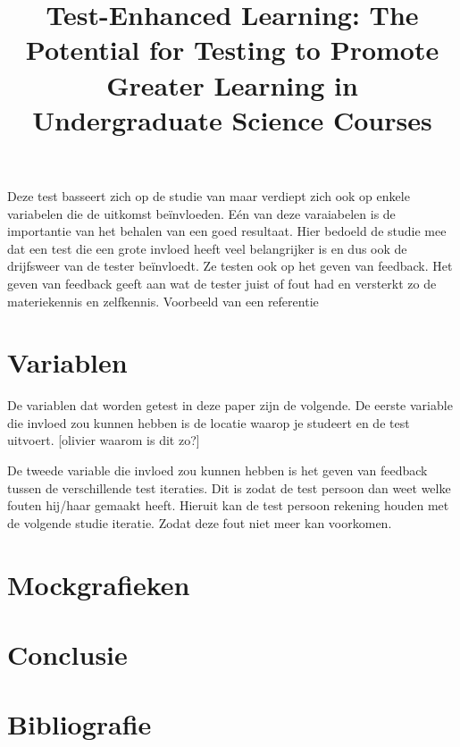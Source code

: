 \documentclass{hogent-article}
\begin{document}
    \title{Test-Enhanced Learning: The Potential for Testing to Promote Greater Learning in Undergraduate Science Courses}
    Deze test basseert zich op de studie van \autocite{} maar verdiept zich ook op enkele variabelen die de uitkomst beïnvloeden. Eén van deze varaiabelen is de importantie van het behalen van een goed resultaat. Hier bedoeld de studie mee dat een test die een grote invloed heeft veel belangrijker is en dus ook de drijfsweer van de tester beïnvloedt.
    Ze testen ook op het geven van feedback. Het geven van feedback geeft aan wat de tester juist of fout had en versterkt zo de materiekennis en zelfkennis.
	Voorbeeld van een referentie~\autocite{karpicke2008critical}
	
	\section{Variablen}
	De variablen dat worden getest in deze paper zijn de volgende.
	De eerste variable die invloed zou kunnen hebben is de locatie waarop je studeert en de test uitvoert.
	[olivier waarom is dit zo?]
	
	De tweede variable die invloed zou kunnen hebben is het geven van feedback tussen de verschillende test iteraties. 
	Dit is zodat de test persoon dan weet welke fouten hij/haar gemaakt heeft. Hieruit kan de test persoon rekening houden met de volgende studie iteratie. Zodat deze fout niet meer kan voorkomen. 
	
	\section{Mockgrafieken}
	
	\section{Conclusie}
	
	\section{Bibliografie}
	
	\printbibliography[heading=bibintoc]
	
\end{document}

